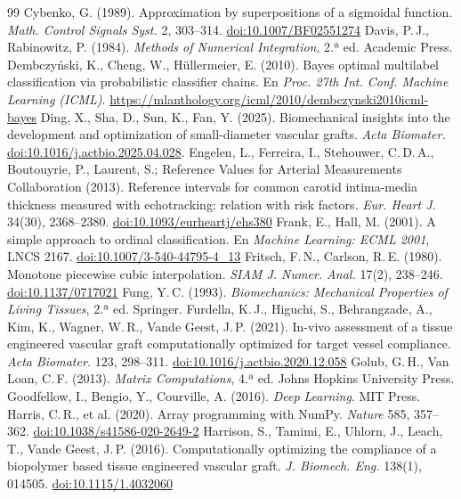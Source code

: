 \begin{thebibliography}{99}
 Cybenko, G. (1989). Approximation by superpositions of a sigmoidal function. \emph{Math. Control Signals Syst.} 2, 303--314. \href{https://doi.org/10.1007/BF02551274}{doi:10.1007/BF02551274}
 Davis, P.\,J., Rabinowitz, P. (1984). \emph{Methods of Numerical Integration}, 2.ª ed. Academic Press.
 Dembczy\'nski, K., Cheng, W., Hüllermeier, E. (2010). Bayes optimal multilabel classification via probabilistic classifier chains. En \emph{Proc. 27th Int. Conf. Machine Learning (ICML)}. \url{https://mlanthology.org/icml/2010/dembczynski2010icml-bayes}
 Ding, X., Sha, D., Sun, K., Fan, Y. (2025). Biomechanical insights into the development and optimization of small-diameter vascular grafts. \emph{Acta Biomater.} \href{https://doi.org/10.1016/j.actbio.2025.04.028}{doi:10.1016/j.actbio.2025.04.028}.
 Engelen, L., Ferreira, I., Stehouwer, C.\,D.\,A., Boutouyrie, P., Laurent, S.; Reference Values for Arterial Measurements Collaboration (2013). Reference intervals for common carotid intima-media thickness measured with echotracking: relation with risk factors. \emph{Eur. Heart J.} 34(30), 2368--2380. \href{https://doi.org/10.1093/eurheartj/ehs380}{doi:10.1093/eurheartj/ehs380}
 Frank, E., Hall, M. (2001). A simple approach to ordinal classification. En \emph{Machine Learning: ECML 2001}, LNCS 2167. \href{https://doi.org/10.1007/3-540-44795-4_13}{doi:10.1007/3-540-44795-4\_13}
 Fritsch, F.\,N., Carlson, R.\,E. (1980). Monotone piecewise cubic interpolation. \emph{SIAM J. Numer. Anal.} 17(2), 238--246. \href{https://doi.org/10.1137/0717021}{doi:10.1137/0717021}
 Fung, Y.\,C. (1993). \emph{Biomechanics: Mechanical Properties of Living Tissues}, 2.ª ed. Springer.
 Furdella, K.\,J., Higuchi, S., Behrangzade, A., Kim, K., Wagner, W.\,R., Vande Geest, J.\,P. (2021). In-vivo assessment of a tissue engineered vascular graft computationally optimized for target vessel compliance. \emph{Acta Biomater.} 123, 298--311. \href{https://doi.org/10.1016/j.actbio.2020.12.058}{doi:10.1016/j.actbio.2020.12.058}
 Golub, G.\,H., Van Loan, C.\,F. (2013). \emph{Matrix Computations}, 4.ª ed. Johns Hopkins University Press.
 Goodfellow, I., Bengio, Y., Courville, A. (2016). \emph{Deep Learning}. MIT Press.
 Harris, C.\,R., et al. (2020). Array programming with NumPy. \emph{Nature} 585, 357--362. \href{https://doi.org/10.1038/s41586-020-2649-2}{doi:10.1038/s41586-020-2649-2}
 Harrison, S., Tamimi, E., Uhlorn, J., Leach, T., Vande Geest, J.\,P. (2016). Computationally optimizing the compliance of a biopolymer based tissue engineered vascular graft. \emph{J. Biomech. Eng.} 138(1), 014505. \href{https://doi.org/10.1115/1.4032060}{doi:10.1115/1.4032060}

\end{thebibliography}
